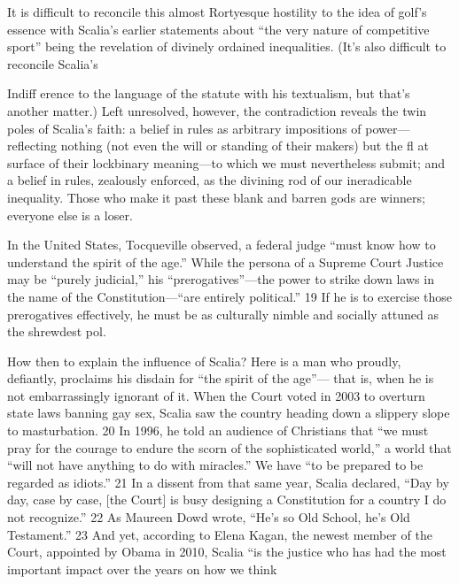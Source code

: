  \par 
It is difficult to reconcile this almost Rortyesque hostility to the idea of golf's essence with Scalia’s earlier statements about “the very nature of competitive sport” being the revelation of divinely ordained inequalities. (It’s also difficult to reconcile Scalia’s
 \par 
Indiff erence to the language of the statute with his textualism, but that’s another matter.) Left unresolved, however, the contradiction reveals the twin poles of Scalia’s faith: a belief in rules as arbitrary impositions of power—reflecting nothing (not even the will or standing of their makers) but the fl at surface of their lockbinary meaning—to which we must nevertheless submit; and a belief in rules, zealously enforced, as the divining rod of our ineradicable inequality. Those who make it past these blank and barren gods are winners; everyone else is a loser.
 \par 
In the United States, Tocqueville observed, a federal judge “must know how to understand the spirit of the age.” While the persona of a Supreme Court Justice may be “purely judicial,” his “prerogatives”—the power to strike down laws in the name of the Constitution—“are entirely political.” {\color{blue}19} If he is to exercise those prerogatives effectively, he must be as culturally nimble and socially attuned as the shrewdest pol.
 \par 
How then to explain the influence of Scalia? Here is a man who proudly, defiantly, proclaims his disdain for “the spirit of the age”— that is, when he is not embarrassingly ignorant of it. When the Court voted in 2003 to overturn state laws banning gay sex, Scalia saw the country heading down a slippery slope to masturbation. {\color{blue}20} In 1996, he told an audience of Christians that “we must pray for the courage to endure the scorn of the sophisticated world,” a world that “will not have anything to do with miracles.” We have “to be prepared to be regarded as idiots.” {\color{blue}21} In a dissent from that same year, Scalia declared, “Day by day, case by case, [the Court] is busy designing a Constitution for a country I do not recognize.” {\color{blue}22} As Maureen Dowd wrote, “He’s so Old School, he’s Old Testament.” {\color{blue}23} And yet, according to Elena Kagan, the newest member of the Court, appointed by Obama in 2010, Scalia “is the justice who has had the most important impact over the years on how we think
 \par 
